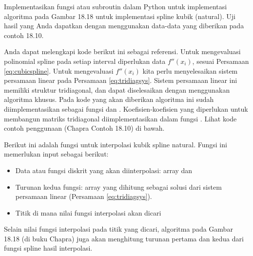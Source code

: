 \begin{soal}
Implementasikan fungsi atau subroutin dalam Python untuk implementasi algoritma
pada Gambar 18.18 untuk implementasi spline kubik (natural).
Uji hasil yang Anda dapatkan dengan menggunakan data-data yang diberikan pada contoh
18.10.
\end{soal}

Anda dapat melengkapi kode berikut ini sebagai referensi.
Untuk mengevaluasi polinomial spline pada setiap interval diperlukan data $f''(x_{i})$, sesuai
Persamaan \eqref{eq:cubicspline}.
Untuk mengevaluasi $f''(x_{i})$ kita perlu menyelesaikan sistem persamaan linear pada
Persamaan \eqref{eq:tridiagsys}. Sistem persamaan linear ini memiliki struktur tridiagonal, dan
dapat diselesaikan dengan menggunakan algoritma khusus. Pada kode yang akan diberikan algoritma
ini sudah diimplementasikan sebagai fungsi  dan .
Koefisien-koefisien yang diperlukan untuk membangun matriks tridiagonal diimplementasikan
dalam fungsi . Lihat kode contoh penggunaan (Chapra Contoh 18.10)
di bawah.

Berikut ini adalah fungsi untuk interpolasi kubik spline natural. Fungsi ini memerlukan
input sebagai berikut:
\begin{itemize}
\item Data atau fungsi diskrit yang akan diinterpolasi: array  dan 
\item Turunan kedua fungsi: array  yang dihitung sebagai solusi dari sistem
persamaan linear (Persamaan \eqref{eq:tridiagsys}).
\item Titik di mana nilai fungsi interpolasi akan dicari
\end{itemize}
Selain nilai fungsi interpolasi pada titik yang dicari, algoritma pada Gambar 18.18 (di buku Chapra)
juga akan menghitung turunan pertama dan kedua dari fungsi spline hasil interpolasi.

